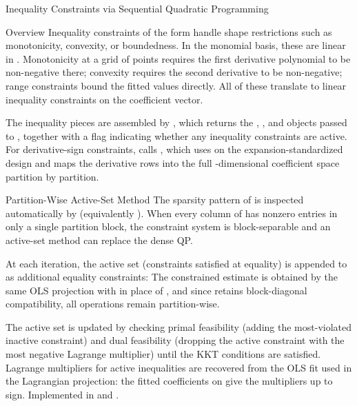 %
\begin{Section}{Inequality Constraints via Sequential Quadratic Programming}


%
\begin{SubSection}{Overview}
Inequality constraints of the form
 handle
shape restrictions such as monotonicity, convexity, or boundedness. In
the monomial basis, these are linear in \eqn{\boldsymbol{\beta}}{}.
Monotonicity at a grid of points requires the first derivative polynomial
to be non-negative there; convexity requires the second derivative to be
non-negative; range constraints bound the fitted values directly. All of
these translate to linear inequality constraints on the coefficient
vector.

The inequality pieces are assembled by , which
returns the , , and  objects
passed to , together with a
 flag indicating whether any inequality constraints are
active. For derivative-sign constraints,  calls
, which uses
 on the expansion-standardized
design and maps the derivative rows into the full -dimensional
coefficient space partition by partition.
\end{SubSection}


%
\begin{SubSection}{Partition-Wise Active-Set Method}
The sparsity pattern of  is inspected automatically by
 (equivalently
). When every column of
 has nonzero entries in only a single partition block,
the constraint system is block-separable and an active-set method can
replace the dense QP.

At each iteration, the active set  (constraints
satisfied at equality) is appended to  as additional
equality constraints:
The constrained estimate is obtained by the same OLS projection with
 in place of , and
since  retains block-diagonal
compatibility, all operations remain partition-wise.

The active set is updated by checking primal feasibility (adding the
most-violated inactive constraint) and dual feasibility (dropping the
active constraint with the most negative Lagrange multiplier) until the
KKT conditions are satisfied. Lagrange multipliers for active
inequalities are recovered from the OLS fit used in the Lagrangian
projection: the fitted coefficients on
 give
the multipliers up to sign. Implemented in
 and
.


\end{SubSection}
\end{Section}
